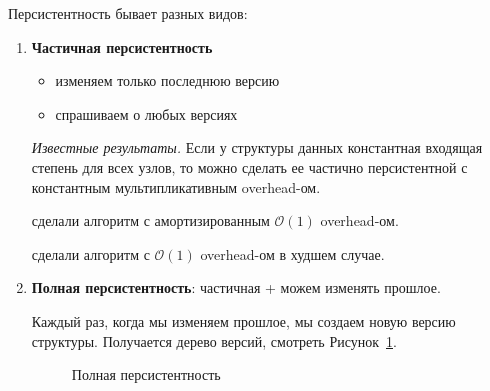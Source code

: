 Персистентность бывает разных видов:

\begin{enumerate}

\item {\bf Частичная персистентность}

\begin{itemize}

\item изменяем только последнюю версию
\item спрашиваем о любых версиях

\end{itemize}

\vspace{10pt}

{\it Известные результаты.} Если у структуры данных константная входящая степень для всех узлов, то можно сделать ее частично персистентной с константным мультипликативным overhead-ом.

\cite{driscoll1986making} сделали алгоритм с амортизированным $\mathcal{O}(1)$ overhead-ом.

\cite{brodal1996partially} сделали алгоритм с $\mathcal{O}(1)$ overhead-ом в худшем случае.

\item \label{item:fullPers} {\bf Полная персистентность}: частичная + можем изменять прошлое.

Каждый раз, когда мы изменяем прошлое, мы создаем новую версию структуры. Получается дерево версий, смотреть Рисунок~\ref{fig:TanyaTree}.

\begin{figure}[h] \centering
{}
	\caption{Полная персистентность}
	\label{fig:TanyaTree}
\end{figure}


\end{enumerate}
